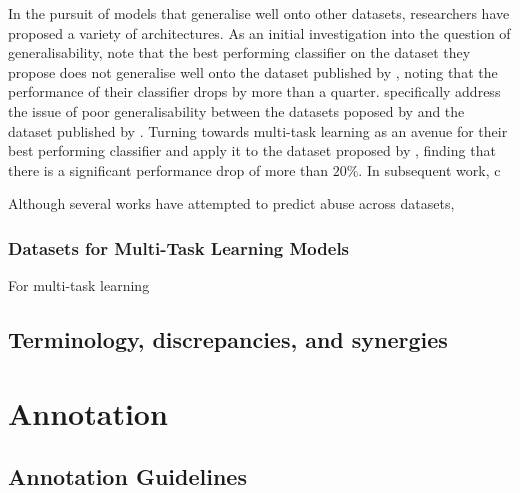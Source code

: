 In the pursuit of models that generalise well onto other datasets, researchers have proposed a variety of architectures. As an initial investigation into the question of generalisability, \citet{Waseem:2016} note that the best performing classifier on the dataset they propose does not generalise well onto the dataset published by \citet{Waseem-Hovy:2016}, noting that the performance of their classifier drops by more than a quarter. \citet{Waseem:2018} specifically address the issue of poor generalisability between the datasets poposed by \citet{Waseem:2016,Waseem-Hovy:2016} and the dataset published by \citet{Davidson:2017}. Turning towards multi-task learning as an avenue for
their best performing classifier and apply it to the dataset proposed by \citet{Waseem-Hovy:2016}, finding that there is a significant performance drop of more than $20\%$. In subsequent work, \citet{Waseem:2018} c

Although several works have attempted to predict abuse across datasets,

\subsubsection{Datasets for Multi-Task Learning Models}

For multi-task learning

\subsection{Terminology, discrepancies, and synergies}



\section{Annotation}

\subsection{Annotation Guidelines}

